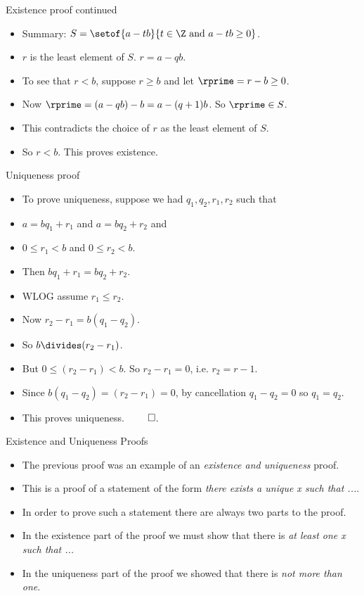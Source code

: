 \documentclass[handout]{beamer}
\begin{document}
\begin{frame}{Existence proof continued}


\begin{itemize}
  \item Summary: $S = \setof{a-tb}{t\in\Z\text{ and }a-tb\geq 0}$.
  \item $r$ is the least element of $S$. $r=a-qb$.
  \item To see that $r < b$, suppose $r \geq b$ and let $\rprime = r -b \geq 0$.
  \item Now $\rprime  = (a-qb) -b = a-(q+1)b$. So $\rprime \in S$.
  \item This contradicts the choice of $r$ as the least element of $S$.
  \item So $r < b$. This proves existence.
\end{itemize}

\end{frame}

\begin{frame}{Uniqueness proof}


\begin{itemize}
  \item To prove uniqueness, suppose we had $q_1, q_2, r_1, r_2$ such that
  \item $a = b q_1 + r_1$ and $a = b q_2 + r_2$ and
  \item $0\leq r_1 < b$ and $0 \leq r_2 < b$.
  \item Then $b q_1 + r_1 = b q_2 + r_2$.
  \item WLOG assume $r_1 \leq r_2$.
  \item Now $r_2 - r_1 = b (q_1 - q_2)$.
  \item So $b \divides (r_2 - r_1)$.
  \item But $0\leq (r_2 - r_1) < b$. So $r_2 - r_1 = 0$, i.e. $r_2 = r-1$.
  \item Since $b (q_1 - q_2) = (r_2 - r_1) = 0$, by cancellation $q_1 - q_2 = 0$ so $q_1 = q_2$.
  \item This proves uniqueness. $\qed$.
\end{itemize}

\end{frame}

\begin{frame}{Existence and Uniqueness Proofs}


\begin{itemize}
  \item The previous proof was an example of an \emph{existence and uniqueness} proof.
  \item This is a proof of a statement of the form \emph{there exists a unique x such that ...}.
  \item In order to prove such a statement there are always two parts to the proof.
  \item In the existence part of the proof we must show that there is \emph{at least one x such that ...}
  \item In the uniqueness part of the proof we showed that there is \emph{not more than one}.
\end{itemize}

\end{frame}
\end{document}
